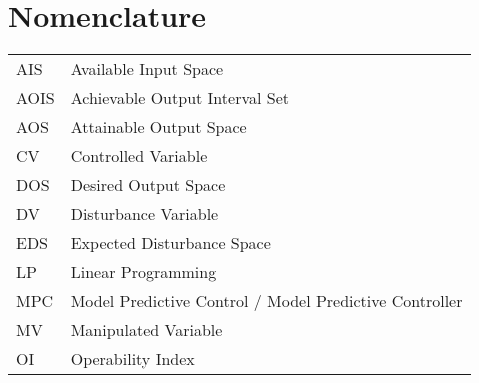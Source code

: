 \maketitle
\makecoverpage

\pagestyle{plain}
\thispagestyle{plain}



%

\tableofcontents
\newpage
\listoffigures{}
\newpage
\listoftables{}
\newpage
\chapter*{Nomenclature}

\begin{tabular}{ll}
  AIS & Available Input Space \\
  AOIS & Achievable Output Interval Set \citep{limaphd} \\
  AOS & Attainable Output Space \\
  CV  & Controlled Variable \\
  DOS & Desired Output Space \\
  DV  & Disturbance Variable \\
  EDS & Expected Disturbance Space \\
  LP  & Linear Programming \\
  MPC & Model Predictive Control / Model Predictive Controller \\
  MV  & Manipulated Variable \\
  OI  & Operability Index \citep{vinsonphd} \\
\end{tabular}

\newpage

